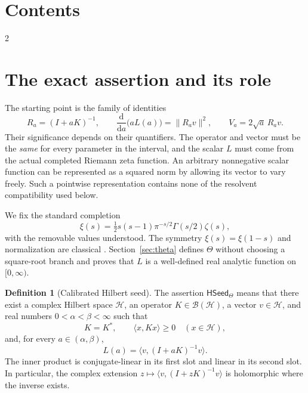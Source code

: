 \documentclass[11pt,a4paper]{article}
\numberwithin{equation}{section}
\theoremstyle{definition}
\newtheorem{definition}[theorem]{Definition}
\theoremstyle{remark}
\newcommand{\HH}{\mathcal H}
\newcommand{\BB}{\mathcal B}
\newcommand{\ip}[2]{\langle #1,#2\rangle}
\newcommand{\norm}[1]{\lVert #1\rVert}
\newcommand{\HSeed}{\mathsf{HSeed}_{\Theta}}
\begin{document}
\section*{Contents}
\begin{multicols}{2}
\footnotesize\setlength{\parskip}{0pt}
\makeatletter{}\makeatother
\end{multicols}
\clearpage

\section[Assertion and scope]{The exact assertion and its role}\label{sec:assertion}

The starting point is the family of identities
\begin{equation}\label{eq:anchor-intro}
R_a=(I+aK)^{-1},\qquad
\frac{\mathrm d}{\mathrm da}\bigl(aL(a)\bigr)=\norm{R_av}^{2},\qquad
V_a=2\sqrt a\,R_av.
\end{equation}
Their significance depends on their quantifiers. The operator and vector
must be the \emph{same} for every parameter in the interval, and the scalar
$L$ must come from the actual completed Riemann zeta function. An arbitrary
nonnegative scalar function can be represented as a squared norm by
allowing its vector to vary freely. Such a pointwise representation contains
none of the resolvent compatibility used below.

We fix the standard completion
\begin{equation}\label{eq:xi}
\xi(s)=\tfrac12s(s-1)\pi^{-s/2}\Gamma(s/2)\zeta(s),
\end{equation}
with the removable values understood. The symmetry $\xi(s)=\xi(1-s)$
and normalization are classical \cite{dlmf-reflection}. Section~\ref{sec:theta}
defines $\Theta$ without choosing a square-root branch and proves that
$L$ is a well-defined real analytic function on $[0,\infty)$.

\begin{definition}[Calibrated Hilbert seed]\label{def:hseed}
The assertion $\HSeed$ means that there exist a complex Hilbert space
$\HH$, an operator $K\in\BB(\HH)$, a vector $v\in\HH$, and real numbers
$0<\alpha<\beta<\infty$ such that
\begin{equation}\label{eq:seed-hypotheses}
K=K^*,\qquad \ip{x}{Kx}\geq0\quad(x\in\HH),
\end{equation}
and, for every $a\in(\alpha,\beta)$,
\begin{equation}\label{eq:hseed}
L(a)=\ip{v}{(I+aK)^{-1}v}.
\end{equation}
The inner product is conjugate-linear in its first slot and linear in its
second slot. In particular, the complex extension
$z\mapsto\ip{v}{(I+zK)^{-1}v}$ is holomorphic where the inverse exists.
\end{definition}
\end{document}
